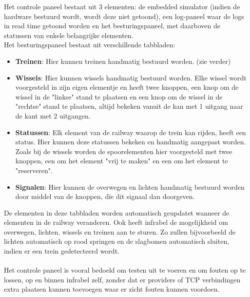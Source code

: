 \documentclass[a4paper, 11pt]{article}
\newcommand{\<}{\scriptsize\textless\normalsize}
\renewcommand{\>}{\scriptsize\textgreater\normalsize}
\begin{document}
Het controle paneel bestaat uit 3 elementen: de embedded simulator (indien de hardware bestuurd wordt, wordt deze niet getoond), een log-paneel waar de logs in read time getoond worden en het besturingspaneel, met daarboven de statussen van enkele belangrijke elementen.\\
Het besturingspaneel bestaat uit verschillende tabbladen:
\begin{itemize}
  \item \textbf{Treinen}: Hier kunnen treinen handmatig bestuurd worden. (zie verder)
  \item \textbf{Wissels}: Hier kunnen wissels handmatig bestuurd worden. Elke wissel wordt voorgesteld in zijn eigen elementje en heeft twee knoppen, een knop om de wissel in de "linkse" stand te plaatsen en een knop om de wissel in de "rechtse" stand te plaatsen, altijd bekeken vanuit de kan met 1 uitgang naar de kant met 2 uitgangen.
  \item \textbf{Statussen}: Elk element van de railway waarop de trein kan rijden, heeft een status. Hier kunnen deze statussen bekeken en handmatig aangepast worden. Zoals bij de wissels worden de spoorelementen hier voorgesteld met twee knoppen, een om het element "vrij te maken" en een om het element te "reserveren".
  \item \textbf{Signalen}: Hier kunnen de overwegen en lichten handmatig bestuurd worden door middel van de knoppen, die dit signaal dan doorgeven.
\end{itemize}
De elementen in deze tabbladen worden automatisch geupdatet wanneer de elementen in de railway veranderen. Ook heeft infrabel de mogelijkheid om overwegen, lichten, wissels en treinen aan te sturen. Zo zullen bijvoorbeeld de lichten automatisch op rood springen en de slagbomen automatisch sluiten, indien er een trein gedetecteerd wordt.\\\\
Het controle paneel is vooral bedoeld om testen uit te voeren en om fouten op te lossen, op en binnen infrabel zelf, zonder dat er providers of TCP verbindingen extra plaatsen kunnen toevoegen waar er zicht fouten kunnen voordoen. 

\newpage
\end{document}

